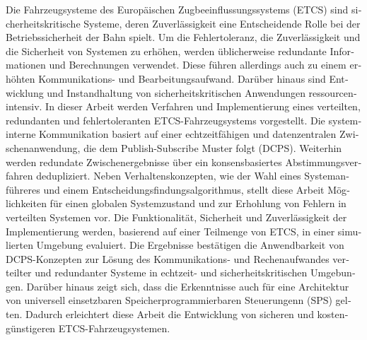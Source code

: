 \null\vfil
\begin{otherlanguage}{ngerman}
\begin{center}\textsf{\textbf{\abstractname}}\end{center}

\noindent 

Die Fahrzeugsysteme des Europäischen Zugbeeinflussungssystems (ETCS) sind sicherheitskritische Systeme, deren Zuverlässigkeit eine Entscheidende Rolle bei der Betriebssicherheit der Bahn spielt.
Um die Fehlertoleranz, die Zuverlässigkeit und die Sicherheit von Systemen zu erhöhen, werden üblicherweise redundante Informationen und Berechnungen verwendet.
Diese führen allerdings auch zu einem erhöhten Kommunikations- und Bearbeitungsaufwand.
Darüber hinaus sind Entwicklung und Instandhaltung von sicherheitskritischen Anwendungen ressourcenintensiv.
In dieser Arbeit werden Verfahren und Implementierung eines verteilten, redundanten und fehlertoleranten ETCS-Fahrzeugsystems vorgestellt.
Die systeminterne Kommunikation basiert auf einer echtzeitfähigen und datenzentralen Zwischenanwendung, die dem Publish-Subscribe Muster folgt (DCPS).
Weiterhin werden redundate Zwischenergebnisse über ein konsensbasiertes Abstimmungsverfahren dedupliziert.
Neben Verhaltenskonzepten, wie der Wahl eines Systemanführeres und einem Entscheidungsfindungsalgorithmus, stellt diese Arbeit Möglichkeiten für einen globalen Systemzustand und zur Erhohlung von Fehlern in verteilten Systemen vor.
Die Funktionalität, Sicherheit und Zuverlässigkeit der Implementierung werden, basierend auf einer Teilmenge von ETCS, in einer simulierten Umgebung evaluiert.
Die Ergebnisse bestätigen die Anwendbarkeit von DCPS-Konzepten zur Lösung des Kommunikations- und Rechenaufwandes verteilter und redundanter Systeme in echtzeit- und sicherheitskritischen Umgebungen.
Darüber hinaus zeigt sich, dass die Erkenntnisse auch für eine Architektur von universell einsetzbaren Speicherprogrammierbaren Steuerungenn (SPS) gelten. 
Dadurch erleichtert diese Arbeit die Entwicklung von sicheren und kostengünstigeren ETCS-Fahrzeugsystemen.

\end{otherlanguage}
\vfil\null



